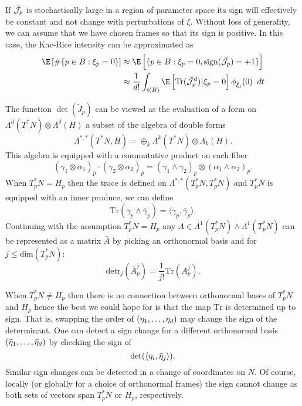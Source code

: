 \documentclass{article}
\newcommand{\randsec}{\xi}
\begin{document}
If $\breve{\cal J}_p$ is stochastically large in a region of parameter space its
sign will effectively be constant and not change with perturbations
of $\randsec$. Without loss of generality, we can assume that we have chosen frames so that its sign is positive.
In this case, the Kac-Rice intensity can be approximated as
\begin{equation}
  \label{eq:sign:definite}
\begin{aligned}
\E \left[\# \{p \in B: \randsec_p=0\} \right] & \approx \E \left[\{p \in B: \randsec_p=0, \text{sign}(\breve{\cal J}_p)=+1\} \right] \\
& \approx \frac{1}{d!} \int_{\coordchart(B)} \E \left[ \text{Tr}(\breve{\cal J}_p^d) \bigl| \randsec_p=0\right] \phi_{\breve{\randsec}_t}(0) \; \; dt
\end{aligned}
  \end{equation}

The function $\det(\breve{J}_p)$ can be viewed as the evaluation of a form on $\Lambda^d(T^*N) \otimes \Lambda^d(H)$
a subset of the algebra of double forms
$$\Lambda^{*,*}(T^*N, H) = \oplus_{k} \Lambda^{k}(T^*N) \otimes \Lambda_{k}(H).$$
This algebra is equipped with a commutative product on each fiber
$$
(\gamma_1 \otimes \alpha_1)_p \cdot (\gamma_2 \otimes \alpha_2)_p = (\gamma_1 \wedge \gamma_2)_p \otimes (\alpha_1 \wedge \alpha_2)_p.
$$
When $T^*_pN = H_p$ then the trace is defined on $\Lambda^{*,*}(T^*_pN, T^*_pN)$ and $T^*_pN$ is equipped
with an inner produce, we can define
$$
\text{Tr}(\gamma_p \wedge \bar{\gamma}_p) = \langle \gamma_p, \bar{\gamma}_p \rangle.
$$
Continuing with the assumption $T^*_pN=H_p$ any $A \in \Lambda^1(T^*_pN) \wedge \Lambda^1(T^*_pN)$
can be represented as a matrix $\bar{A}$ by picking an orthonormal basis
and for $j \leq \text{dim}(T^*_pN)$:
$$
\text{detr}_j(\bar{A}^j_p) = \frac{1}{j!} \text{Tr}(A^j_p).
$$

When $T_p^*N \neq H_p$ then there is no connection between orthonormal bases
of $T_p^*N$ and $H_p$ hence the best we could hope for is that the
map $\text{Tr}$ is determined up to sign. That is, swapping the order of  $(\eta_1, \dots, \eta_d)$ may change the sign of the determinant. One can detect a sign change for a different orthonormal basis $(\bar{\eta}_1, \dots, \bar{\eta}_d)$ by
checking the sign of
$$
\text{det}(\langle \eta_i, \bar{\eta}_j \rangle).
$$
Similar sign changes can be detected in a change of coordinates on $N$. Of course, locally (or globally for a choice of orthonormal frames) the sign
cannot change as both sets of vectors span $T_p^*N$ or $H_p$, respectively.
\end{document}
